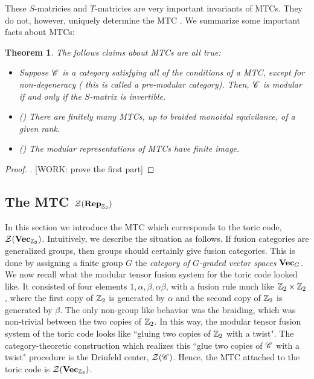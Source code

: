 \documentclass{article}
\newtheorem{theorem}{Theorem}[section]
\theoremstyle{definition}
\numberwithin{figure}{section}
\begin{document}
These $S$-matricies and $T$-matricies are very important invariants of MTCs. They do not, however, uniquely determine the MTC \cite{mignard2021modular}. We summarize some important facts about MTCs:

\begin{theorem} The follows claims about MTCs are all true:

\begin{itemize}
\item Suppose $\mathscr{C}$ is a category satisfying all of the conditions of a MTC, except for non-degeneracy ( this is called a pre-modular category). Then, $\mathscr{C}$ is modular if and only if the $S$-matrix is invertible.
\item (\cite{bruillard2016rank}) There are finitely many MTCs, up to braided monoidal equivilance, of a given rank.
\item (\cite{ng2010congruence}) The modular representations of MTCs have finite image.
\end{itemize}
\end{theorem}
\begin{proof}. [WORK: prove the first part]
\end{proof}

\subsection{The MTC $\mathcal{Z}(\bold{Rep}_{\mathbb{Z}_2})$}
\label{VecZ2 MTC}

In this section we introduce the MTC which corresponds to the toric code, $\mathcal{Z}(\bold{Vec}_{\mathbb{Z}_2})$. Intuitively, we describe the situation as follows. If fusion categories are generalized groups, then groups should certainly give fusion categories. This is done by assigning a finite group $G$ the \textit{category of $G$-graded vector spaces} $\bold{Vec}_G$. We now recall what the modular tensor fusion system for the toric code looked like. It consisted of four elements $1,\alpha,\beta,\alpha\beta$, with a fusion rule much like $\mathbb{Z}_2\times \mathbb{Z}_2$, where the first copy of $\mathbb{Z}_2$ is generated by $\alpha$ and the second copy of $\mathbb{Z}_2$ is generated by $\beta$. The only non-group like behavior was the braiding, which was non-trivial between the two copies of $\mathbb{Z}_2$. In this way, the modular tensor fusion system of the toric code looks like ``gluing two copies of $\mathbb{Z}_2$ with a twist". The category-theoretic construction which realizes this ``glue two copies of $\mathscr{C}$ with a twist" procedure is the Drinfeld center, $\mathcal{Z}(\mathscr{C})$. Hence, the MTC attached to the toric code is $\mathcal{Z}(\bold{Vec}_{\mathbb{Z}_2})$.
\end{document}

